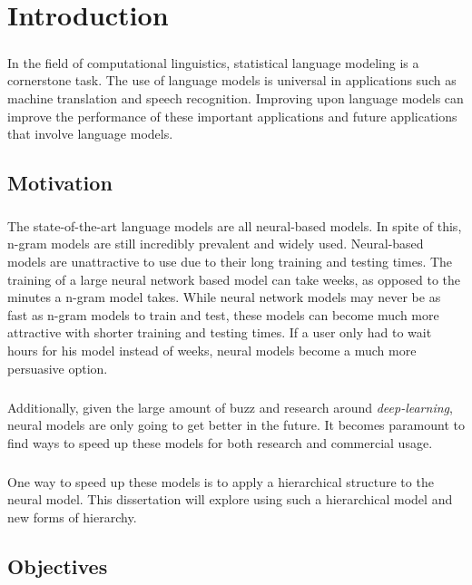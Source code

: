 
\chapter{Introduction}
\paragraph{}
In the field of computational linguistics, statistical language modeling is a cornerstone task. The use of language models  is universal in applications such as machine translation and speech recognition.  Improving upon language models can improve the performance of these important applications and future applications that involve language models.
\section{Motivation}
\paragraph{}
The state-of-the-art language models are all neural-based models. In spite of this, n-gram models are still incredibly prevalent and widely used. Neural-based models are unattractive to use due to their long training and testing times. The training of a large neural network based model can take weeks, as opposed to the minutes a n-gram model takes. While neural network models may never be as fast as n-gram models to train and test, these models can become much more attractive with shorter training and testing times. If a user only had to wait hours for his model instead of weeks, neural models become a much more persuasive option.
\paragraph{}
Additionally, given the large amount of buzz and research around \emph{deep-learning}, neural models are only going to get better in the future. It becomes paramount to find ways to speed up these models for both research and commercial usage.
\paragraph{}
One way to speed up these models is to apply a hierarchical structure to the neural model. This dissertation will explore using such a hierarchical model and new forms of hierarchy.

\section{Objectives}
